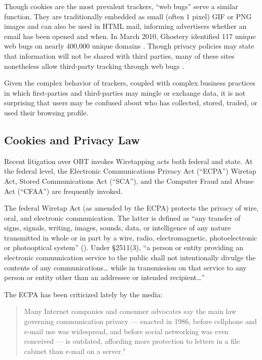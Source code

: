 Though cookies are the most prevalent trackers, ``web bugs'' serve a similar function. They are traditionally embedded as small (often 1 pixel) GIF or PNG images and can also be used in HTML mail, informing advertisers whether an email has been opened and when. In March 2010, Ghostery identified 117 unique web bugs on nearly 400,000 unique domains  \citep*{Gomez:2009ue}.  Though privacy policies may state that information will not be shared with third parties, many of these sites nonetheless allow third-party tracking through web bugs  \citep{Gomez:2009ue}. 

Given the complex behavior of trackers, coupled with complex business practices in which first-parties and third-parties may mingle or exchange data, it is not surprising that users may be confused about who has collected, stored, traded, or used their browsing profile.

\subsection{Cookies and Privacy Law}
\label{cookiesandprivacylaw}

Recent litigation over OBT invokes Wiretapping acts both federal and state. At the federal level, the Electronic Communications Privacy Act (``ECPA'') Wiretap Act, Stored Communications Act (``SCA''), and the Computer Fraud and Abuse Act (``CFAA'') are frequently invoked. 

The federal Wiretap Act (as amended by the ECPA) protects the privacy of wire, oral, and electronic communication. The latter is defined as ``any transfer of signs, signals, writing, images, sounds, data, or intelligence of any nature transmitted in whole or in part by a wire, radio, electromagnetic, photoelectronic or photooptical system''  (\citeauthor{Anonymous:ux}).  Under  \S  2511(3), ``a person or entity providing an electronic communication service to the public shall not intentionally divulge the contents of any communications{\ldots} while in transmission on that service to any person or entity other than an addressee or intended recipient{\ldots}'' 

The ECPA has been criticized lately by the media:

\begin{quote}
Many Internet companies and consumer advocates say the main law governing communication privacy --- enacted in 1986, before cellphone and e-mail use was widespread, and before social networking was even conceived --- is outdated, affording more protection to letters in a file cabinet than e-mail on a server." \citep{Helft:2011wx}
\end{quote}


